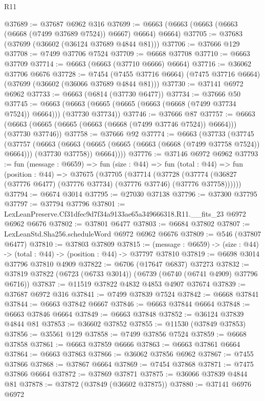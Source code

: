 \begin{lexlean}{R11}
\begin{coremodule}
@37689 := @37687 @6962 @316
@37699 := @6663 (@6663 (@6663 (@6663 (@6668 (@7499 @37689 @7524)) @6667) @6664) @6664)
@37705 := @37683 (@37699 (@36602 (@36124 @37689 @4844 @81)))
@37706 := @37666 @129
@37708 := @7499 @37706 @7524
@37709 := @6668 @37708
@37710 := @6663 @37709
@37714 := @6663 (@6663 (@37710 @6666) @6664)
@37716 := @36062 @37706 @6676
@37728 := @7454
    (@7455 @37716 @6664)
    (@7475 @37716 @6664)
    (@37699 (@36602 (@36066 @37689 @4844 @81)))
@37730 := @37141 @6972 @6962
@37733 := @6663 (@6814 (@37730 @6477))
@37734 := @37666 @50
@37745 := @6663 (@6663 (@6665 (@6665 (@6663 (@6668 (@7499 @37734 @7524)) @6664))) (@37730 @37734))
@37746 := @37666 @87
@37757 := @6663 (@6663 (@6665 (@6665 (@6663 (@6668 (@7499 @37746 @7524)) @6664))) (@37730 @37746))
@37758 := @37666 @92
@37774 := @6663
    (@37733
      (@37745
        (@37757
          (@6663
            (@6663 (@6665 (@6665 (@6663 (@6668 (@7499 @37758 @7524)) @6664))) (@37730 @37758))
            @6664))))
@37776 := @37146 @6972 @6962
@37793 := fun (message : @6659) =>
  fun (size : @44) =>
  fun (total : @44) =>
  fun (position : @44) =>
  @37675
    (@37705
      (@37714
        (@37728 (@37774 (@36827 (@37776 @6477) (@37776 @37734) (@37776 @37746) (@37776 @37758))))))
@37794 := @6674 @3014
@37795 := @27030 @37138
@37796 := @37300 @37795
@37797 := @37794 @37796
@37801 := LexLeanPreserve.Cf31dfec9d7f34a9133ae65a349666318.R11.__fits_23 @6972 @6962 @6676
@37802 := @37801 @6477
@37803 := @6684 @37802
@37807 := LexLeanStd.Sha256.scheduleWord @6972 @6962 @6676
@37809 := @546 (@37807 @6477)
@37810 := @37803 @37809
@37815 := (message : @6659) -> (size : @44) -> (total : @44) -> (position : @44) -> @37797 @37810
@37819 := @6698 @3014 @37796 @37810 @4909
@37822 := @6706 (@17647 @6837) @37273
@37832 := @37819 @37822 (@6723 (@6733 @3014)) (@6739 (@6740 (@6741 @4909) @37796 @6716))
@37837 := @11519 @37822 @4832 @4853 @4907 @37674
@37839 := @37687 @6972 @316
@37841 := @7499 @37839 @7524
@37842 := @6668 @37841
@37844 := @6663 @37842 @6667
@37846 := @6663 @37844 @6664
@37848 := @6663 @37846 @6664
@37849 := @6663 @37848
@37852 := @36124 @37839 @4844 @81
@37853 := @36602 @37852
@37855 := @11530 (@37849 @37853)
@37856 := @35561 @129
@37858 := @7499 @37856 @7524
@37859 := @6668 @37858
@37861 := @6663 @37859 @6666
@37863 := @6663 @37861 @6664
@37864 := @6663 @37863
@37866 := @36062 @37856 @6962
@37867 := @7455 @37866
@37868 := @37867 @6664
@37869 := @7454 @37868
@37871 := @7475 @37866 @6664
@37872 := @37869 @37871
@37875 := @36066 @37839 @4844 @81
@37878 := @37872 (@37849 (@36602 @37875))
@37880 := @37141 @6976 @6972

\end{coremodule}
\end{lexlean}
